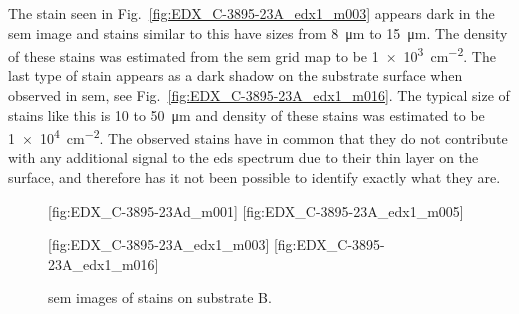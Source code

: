 The stain seen in Fig.~\ref{fig:EDX_C-3895-23A_edx1_m003} appears dark in the \ac{sem} image and stains similar to this have sizes from \SI{8}{\micro\metre} to \SI{15}{\micro\metre}. The density of these stains was estimated from the \ac{sem} grid map to be \SI{1e3}{\centi\metre^{-2}}. The last type of stain appears as a dark shadow on the substrate surface when observed in \ac{sem}, see Fig.~\ref{fig:EDX_C-3895-23A_edx1_m016}. The typical size of stains like this is \SI{10}{} to \SI{50}{\micro\metre} and density of these stains was estimated to be \SI{1e4}{\centi\metre^{-2}}. The observed stains have in common that they do not contribute with any additional signal to the \ac{eds} spectrum due to their thin layer on the surface, and therefore has it not been possible to identify exactly what they are. 
\begin{figure}[htbp]
    \centering
    [fig:EDX_C-3895-23Ad_m001]
    [fig:EDX_C-3895-23A_edx1_m005]
    \par\bigskip
    [fig:EDX_C-3895-23A_edx1_m003]
    [fig:EDX_C-3895-23A_edx1_m016]
    \caption[\Ac{sem} images of stains on substrate B.]{\Acf{sem} images of stains on substrate B.}
    \label{fig:subB_stains}
\end{figure}


